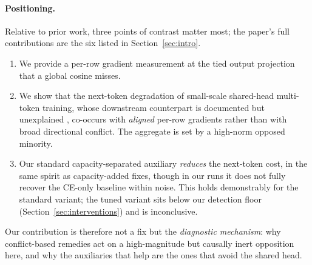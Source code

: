 \paragraph{Positioning.} Relative to prior work, three points of contrast matter most; the paper's full
contributions are the six listed in Section~\ref{sec:intro}.
\begin{enumerate}
\item[(i)] We provide a per-row gradient measurement at the tied output projection
      that a global cosine misses.
\item[(ii)] We show that the next-token degradation of small-scale shared-head
      multi-token training, whose downstream counterpart is documented but
      unexplained \citep{gloeckle2024mtp,zuhri2025top}, co-occurs with \emph{aligned} per-row gradients
      rather than with broad directional conflict. The aggregate is set by a
      high-norm opposed minority.
\item[(iii)] Our standard capacity-separated auxiliary \emph{reduces} the next-token
      cost, in the same spirit as capacity-added fixes, though in our runs it
      does not fully recover the CE-only baseline within noise. This holds
      demonstrably for the standard variant; the tuned variant sits below our detection floor (Section~\ref{sec:interventions}) and is inconclusive.
\end{enumerate}
Our contribution is therefore not a fix but the \emph{diagnostic mechanism}: why
conflict-based remedies act on a high-magnitude but causally inert opposition
here, and why the auxiliaries that help are the ones that avoid the shared head.
